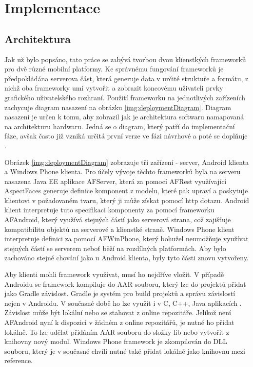 \chapter{Implementace}
\section{Architektura}
Jak už bylo popsáno, tato práce se zabývá tvorbou dvou klienstkých frameworků pro dvě různé mobilní platformy. Ke správnému fungování frameworků je předpokládána serverova část, která generuje data v určité struktuře a formátu, z nichž oba frameworky umí vytvořit a zobrazit koncovému uživateli prvky grafického uživatelského rozhraní. Použití frameworku na jednotlivých zařízeních zachycuje diagram nasazení na obrázku \ref{img:deploymentDiagram}. Diagram nasazení je určen k tomu, aby zobrazil jak je architektura softwaru namapovaná na architekturu hardwaru. Jedná se o diagram, který patří do implementační fáze, avšak často již vzniká určitá první verze ve fázi návrhové a poté se doplňuje \cite{UmlArlow}.

Obrázek \ref{img:deploymentDiagram} zobrazuje tři zařízení - server, Android klienta a Windows Phone klienta. Pro účely vývoje těchto frameworků byla na serveru nasazena Java EE aplikace AFServer, která za pomocí AFRest \cite{tomasek-thesis} využívající AspectFaces \cite{aspect-faces} generuje definice komponent z modelu, které pak upraví a poskytuje klientovi v požadovaném tvaru, který ji může získat pomocí http dotazu. Android klient interpretuje tuto specifikaci komponenty za pomocí frameworku AFAndroid, který využívá stejných částí jako serverová strana, což zajišťuje kompatibilitu objektů na serverové a klienstké straně. Windows Phone klient interpretuje definici za pomocí AFWinPhone, který bohužel neumožňuje využívat stejných částí se serverem neboť běží na rozdílných platformách. Aby bylo zachováno stejné chování jako u Android klienta, byly tyto části znovu vytvořeny.

Aby klienti mohli framework využívat, musí ho nejdříve vložit. V případě Androidu se framework kompiluje do AAR souboru, který lze do projektů přidat jako Gradle závislost. Gradle je systém pro build projektů a správu závislostí nejen v Androidu. V současné době ho lze využít i v C, C++, Java aplikacích \cite{gradle}. Závislost může být lokální nebo se stahovat z online repozitáře. Jelikož není AFAndroid nyní k dispozici v žádném z online repozitářů, je nutné ho přidat lokálně. To lze udělat přidáním AAR souboru do složky lib nebo vytvořit z knihovny nový modul. Windows Phone framework je zkompilován do DLL souboru, který je v současné chvíli nutné také přidat lokálně jako knihovnu mezi reference.

